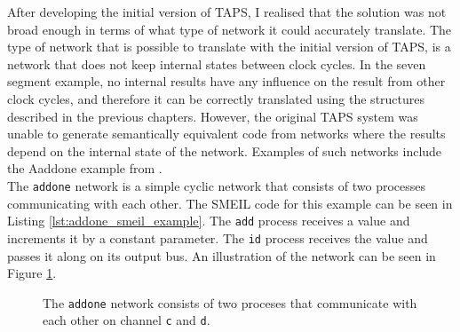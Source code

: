 After developing the initial version of TAPS, I realised that the solution was not broad enough in terms of what type of network it could accurately translate. The type of network that is possible to translate with the initial version of TAPS, is a network that does not keep internal states between clock cycles.
In the seven segment example, no internal results have any influence on the result from other clock cycles, and therefore it can be correctly translated using the structures described in the previous chapters.
However, the original TAPS system was unable to generate semantically equivalent \cspm{} code from networks where the results depend on the internal state of the network. Examples of such networks include the Aaddone example from \cite{smeil}.\\

The \texttt{addone} network is a simple cyclic network that consists of two processes communicating with each other. The SMEIL code for this example can be seen in Listing \ref{lst:addone_smeil_example}. The \texttt{add} process receives a value and increments it by a constant parameter. The \texttt{id} process receives the value and passes it along on its output bus.
An illustration of the network can be seen in Figure \ref{fig:addone_unclocked}.\\
\begin{figure}
    \centering
    \caption{The \texttt{addone} network consists of two proceses that communicate with each other on channel \texttt{c} and \texttt{d}.}
    \label{fig:addone_unclocked}
\end{figure}

